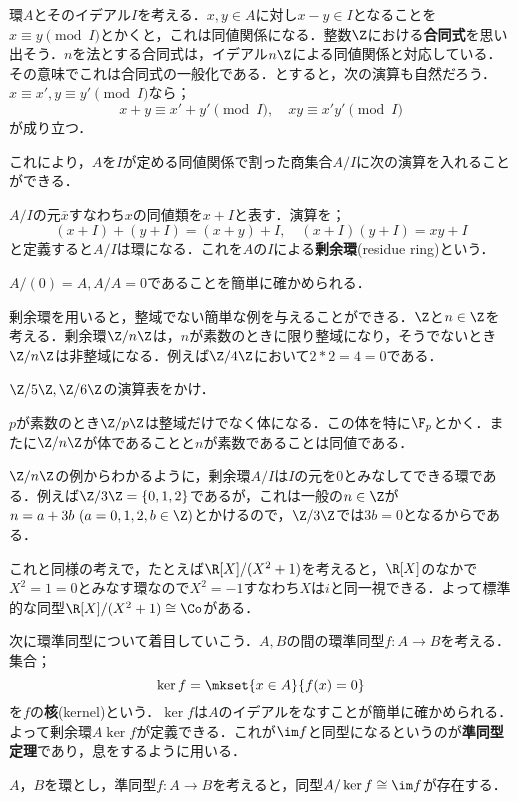 環$A$とそのイデアル$I$を考える．$x,y\in A$に対し$x-y\in I$となることを$x\equiv y \pmod I$とかくと，これは同値関係になる．整数$\Z$における\textbf{合同式}を思い出そう．$n$を法とする合同式は，イデアル$n\Z$による同値関係と対応している．その意味でこれは合同式の一般化である．とすると，次の演算も自然だろう．$x\equiv x',y\equiv y'\pmod I$なら；
\[x+y\equiv x'+y'\pmod I,\quad xy\equiv x'y'\pmod I\]
が成り立つ．

これにより，$A$を$I$が定める同値関係で割った商集合$A/I$に次の演算を入れることができる．

\begin{defi}[剰余環]
	$A/I$の元$\bar{x}$すなわち$x$の同値類を$x+I$と表す．演算を；
	\[(x+I)+(y+I)=(x+y)+I,\quad (x+I)(y+I)=xy+I\]
	と定義すると$A/I$は環になる．これを$A$の$I$による\textbf{剰余環}(residue ring)という．
\end{defi}

$A/(0)=A, A/A=0$であることを簡単に確かめられる．

剰余環を用いると，整域でない簡単な例を与えることができる．$\Z$と$n\in\Z$を考える．剰余環$\Z/n\Z$は，$n$が素数のときに限り整域になり，そうでないとき$\Z/n\Z$は非整域になる．例えば$\Z/4\Z$において$2*2=4=0$である．

\begin{exer}
	$\Z/5\Z,\Z/6\Z$の演算表をかけ．
\end{exer}

$p$が素数のとき$\Z/p\Z$は整域だけでなく体になる．この体を特に$\F_p$とかく．またに$\Z/n\Z$が体であることと$n$が素数であることは同値である．

$\Z/n\Z$の例からわかるように，剰余環$A/I$は$I$の元を0とみなしてできる環である．例えば$\Z/3\Z=\{0,1,2\}$であるが，これは一般の$n\in\Z$が$n=a+3b~(a=0,1,2, b\in\Z)$とかけるので，$\Z/3\Z$では$3b=0$となるからである．

これと同様の考えで，たとえば$\R[X]/(X^2+1)$を考えると，$\R[X]$のなかで$X^2=1=0$とみなす環なので$X^2=-1$すなわち$X$は$i$と同一視できる．よって標準的な同型$\R[X]/(X^2+1)\cong\Co$がある．

次に環準同型について着目していこう．$A,B$の間の環準同型$f:A\to B$を考える．集合；
\[\ker f=\mkset{x\in A}{f(x)=0}\]
を$f$の\textbf{核}(kernel)という．$\ker f$は$A$のイデアルをなすことが簡単に確かめられる．よって剰余環$A\ker f$が定義できる．これが$\im f$と同型になるというのが\textbf{準同型定理}であり，息をするように用いる．

\begin{thm}[準同型定理]
	$A，B$を環とし，準同型$f:A\to B$を考えると，同型$A/\ker f\cong\im f$が存在する．
\end{thm}

